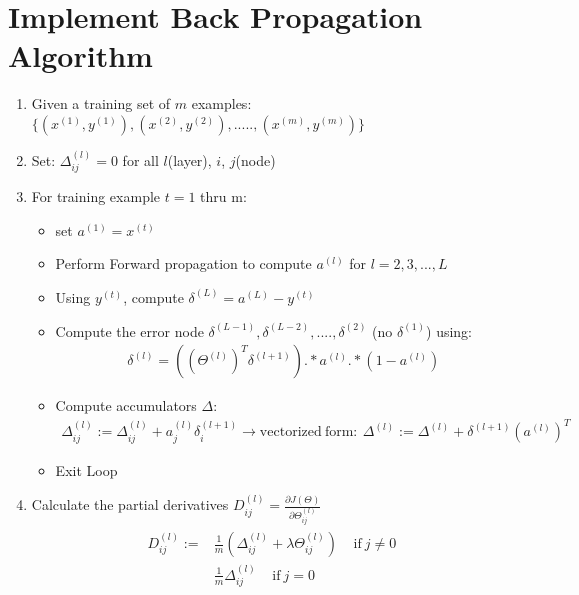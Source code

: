 \documentclass[a4paper,12pt]{report}
\begin{document}
\section{Implement Back Propagation Algorithm}
\begin{enumerate}
\item Given a training set of $m$ examples: $\{(x^{(1)}, y^{(1)}),(x^{(2)}, y^{(2)}), .....,(x^{(m)}, y^{(m)}) \} $
\item Set: $\Delta_{ij} ^{(l)} = 0$ for all $l$(layer), $i$, $j$(node) \\
\item For training example $t=1$ thru m:
\begin{itemize}
\item set $a^{(1)} = x^{(t)}$
\item Perform Forward  propagation to compute $a^{(l)}$ for $l=2, 3, ...,L$
\end{itemize} 
\begin{itemize}
\item Using $y^{(t)}$, compute $\delta^{(L)}=a^{(L)} - y^{(t)}$
\item Compute the error node $\delta^{(L-1)}, \delta^{(L-2)}, ...., \delta^{(2)}$  (no $\delta^{(1)}$) using:
\begin{align}
\delta^{(l)} = \left((\Theta^{(l)})^T \delta^{(l+1)}\right).*a^{(l)}.*(1-a^{(l)})
\end{align}
\item Compute accumulators $\Delta$:
\begin{align*}
\Delta_{ij} ^{(l)} := \Delta_{ij} ^{(l)} + a_{j} ^{(l)} \delta_{i} ^{(l+1)} \rightarrow \mathrm{vectorized \  form:\ } \Delta ^{(l)} := \Delta^{(l)} + \delta^{(l+1)} \left(a^{(l)} \right)^{T}
\end{align*}
\item Exit Loop
\end{itemize}
\item Calculate the partial derivatives $D_{ij}^{(l)} = \frac{\partial J(\Theta)}{\partial \Theta_{ij} ^{(l)}}$
\begin{align*}
\begin{split}
D_{ij}^{(l)} :=& \frac{1}{m} \left(\Delta_{ij}^{(l)} + \lambda \Theta_{ij} ^{(l)} \right) \ \ \ \mathrm{\ \ if \ } j \neq 0 \\
							& \frac{1}{m}\Delta_{ij}^{(l)} \ \ \ \mathrm{\ \ if \ } j=0
\end{split}
\end{align*}
\end{enumerate} 
\end{document}
